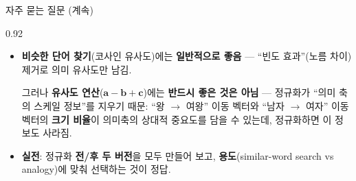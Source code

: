 \begin{frame}{자주 묻는 질문 (계속)}
\begin{center}\begin{varwidth}{0.92\textwidth}
  \small
  \begin{itemize}
    \item {}
      \textbf{비슷한 단어 찾기}(코사인 유사도)에는 \textbf{일반적으로
      좋음} --- ``빈도 효과''(노름 차이) 제거로 의미 유사도만 남김.
      \par 그러나 \textbf{유사도 연산}($\boldsymbol{a} - \boldsymbol{b} +
      \boldsymbol{c}$)에는 \textbf{반드시 좋은 것은 아님} --- 정규화가
      ``의미 축의 스케일 정보''를 지우기 때문: ``왕 $\to$ 여왕'' 이동
      벡터와 ``남자 $\to$ 여자'' 이동 벡터의 \textbf{크기 비율}이
      의미축의 상대적 중요도를 담을 수 있는데, 정규화하면 이 정보도
      사라짐.
    \item \textbf{실전}: 정규화 \textbf{전/후 두 버전}을 모두 만들어
      보고, \textbf{용도}(similar-word search vs analogy)에 맞춰
      선택하는 것이 정답.
  \end{itemize}
\end{varwidth}\end{center}
\end{frame}
